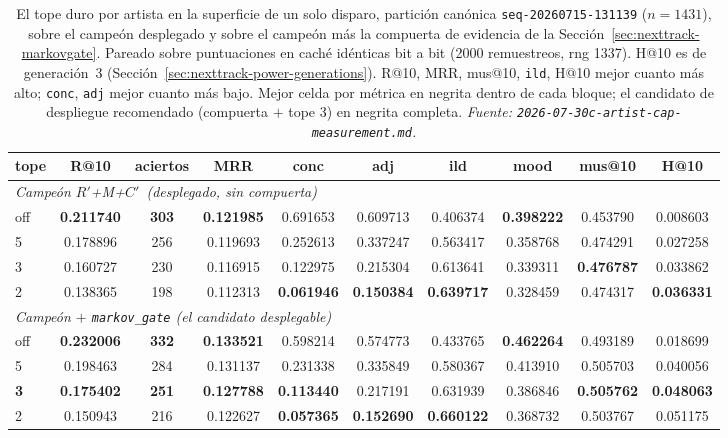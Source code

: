\documentclass[11pt]{article}
\newcommand{\dsid}[1]{\texttt{\small #1}}
\newcommand{\best}[1]{\textbf{#1}}
\newcommand{\Rp}{\ensuremath{R'}}
\newcommand{\Cp}{\ensuremath{C'}}
\begin{document}
\begin{table}[ht]
  \centering
  \caption{El tope duro por artista en la superficie de un solo disparo, partición
  canónica \dsid{seq-20260715-131139} ($n=\num{1431}$), sobre el campeón desplegado
  y sobre el campeón más la compuerta de evidencia de la
  Sección~\ref{sec:nexttrack-markovgate}. Pareado sobre puntuaciones en caché
  idénticas bit a bit (\num{2000} remuestreos, rng \num{1337}). H@10 es de
  generación~3 (Sección~\ref{sec:nexttrack-power-generations}). R@10, MRR, mus@10,
  \texttt{ild}, H@10 mejor cuanto más alto; \texttt{conc}, \texttt{adj} mejor cuanto
  más bajo. Mejor celda por métrica en negrita dentro de cada bloque; el candidato
  de despliegue recomendado (compuerta $+$ tope 3) en negrita completa.
  \emph{Fuente: \texttt{2026-07-30c-artist-cap-measurement.md}.}}
  \label{tab:nexttrack-artistcap}
  {\footnotesize\setlength{\tabcolsep}{4pt}\begin{tabular}{lccccccccc}
    \toprule
    tope & R@10 & aciertos & MRR & conc & adj & ild & mood & mus@10 & H@10 \\
    \midrule
    \multicolumn{10}{l}{\emph{Campeón \Rp+M+\Cp\ (desplegado, sin compuerta)}} \\
    off & \best{0.211740} & \best{303} & \best{0.121985} & 0.691653 & 0.609713 & 0.406374 & \best{0.398222} & 0.453790 & 0.008603 \\
    5   & 0.178896 & 256 & 0.119693 & 0.252613 & 0.337247 & 0.563417 & 0.358768 & 0.474291 & 0.027258 \\
    3   & 0.160727 & 230 & 0.116915 & 0.122975 & 0.215304 & 0.613641 & 0.339311 & \best{0.476787} & 0.033862 \\
    2   & 0.138365 & 198 & 0.112313 & \best{0.061946} & \best{0.150384} & \best{0.639717} & 0.328459 & 0.474317 & \best{0.036331} \\
    \midrule
    \multicolumn{10}{l}{\emph{Campeón $+$ \texttt{markov\_gate} (el candidato desplegable)}} \\
    off & \best{0.232006} & \best{332} & \best{0.133521} & 0.598214 & 0.574773 & 0.433765 & \best{0.462264} & 0.493189 & 0.018699 \\
    5   & 0.198463 & 284 & 0.131137 & 0.231338 & 0.335849 & 0.580367 & 0.413910 & 0.505703 & 0.040056 \\
    \best{3} & \best{0.175402} & \best{251} & \best{0.127788} & \best{0.113440} & 0.217191 & 0.631939 & 0.386846 & \best{0.505762} & \best{0.048063} \\
    2   & 0.150943 & 216 & 0.122627 & \best{0.057365} & \best{0.152690} & \best{0.660122} & 0.368732 & 0.503767 & 0.051175 \\
    \bottomrule
  \end{tabular}}
\end{table}
\end{document}
